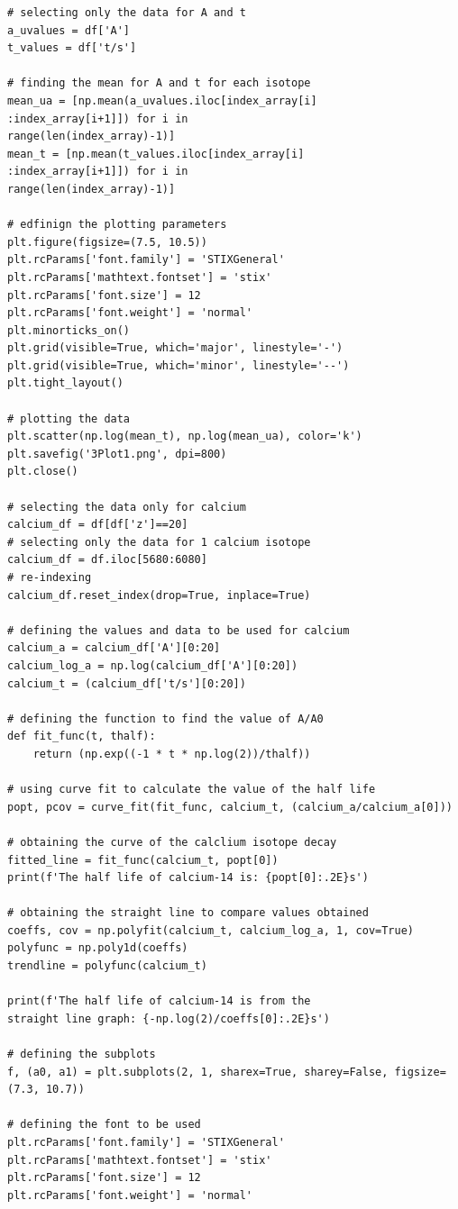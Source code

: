 \documentclass[12pt, a4paper]{article}
\begin{document}
\begin{verbatim}
# selecting only the data for A and t
a_uvalues = df['A']
t_values = df['t/s']

# finding the mean for A and t for each isotope
mean_ua = [np.mean(a_uvalues.iloc[index_array[i]
:index_array[i+1]]) for i in 
range(len(index_array)-1)]
mean_t = [np.mean(t_values.iloc[index_array[i]
:index_array[i+1]]) for i in 
range(len(index_array)-1)]

# edfinign the plotting parameters
plt.figure(figsize=(7.5, 10.5))
plt.rcParams['font.family'] = 'STIXGeneral'
plt.rcParams['mathtext.fontset'] = 'stix'
plt.rcParams['font.size'] = 12
plt.rcParams['font.weight'] = 'normal'
plt.minorticks_on()
plt.grid(visible=True, which='major', linestyle='-')
plt.grid(visible=True, which='minor', linestyle='--')
plt.tight_layout()

# plotting the data
plt.scatter(np.log(mean_t), np.log(mean_ua), color='k')
plt.savefig('3Plot1.png', dpi=800)
plt.close()

# selecting the data only for calcium
calcium_df = df[df['z']==20]
# selecting only the data for 1 calcium isotope
calcium_df = df.iloc[5680:6080]
# re-indexing
calcium_df.reset_index(drop=True, inplace=True)

# defining the values and data to be used for calcium
calcium_a = calcium_df['A'][0:20]
calcium_log_a = np.log(calcium_df['A'][0:20])
calcium_t = (calcium_df['t/s'][0:20])

# defining the function to find the value of A/A0
def fit_func(t, thalf):
    return (np.exp((-1 * t * np.log(2))/thalf))

# using curve fit to calculate the value of the half life
popt, pcov = curve_fit(fit_func, calcium_t, (calcium_a/calcium_a[0]))

# obtaining the curve of the calclium isotope decay
fitted_line = fit_func(calcium_t, popt[0])
print(f'The half life of calcium-14 is: {popt[0]:.2E}s')

# obtaining the straight line to compare values obtained
coeffs, cov = np.polyfit(calcium_t, calcium_log_a, 1, cov=True)
polyfunc = np.poly1d(coeffs)
trendline = polyfunc(calcium_t)

print(f'The half life of calcium-14 is from the
straight line graph: {-np.log(2)/coeffs[0]:.2E}s')

# defining the subplots
f, (a0, a1) = plt.subplots(2, 1, sharex=True, sharey=False, figsize=(7.3, 10.7))

# defining the font to be used
plt.rcParams['font.family'] = 'STIXGeneral'
plt.rcParams['mathtext.fontset'] = 'stix'
plt.rcParams['font.size'] = 12
plt.rcParams['font.weight'] = 'normal'


\end{verbatim}
\end{document}

